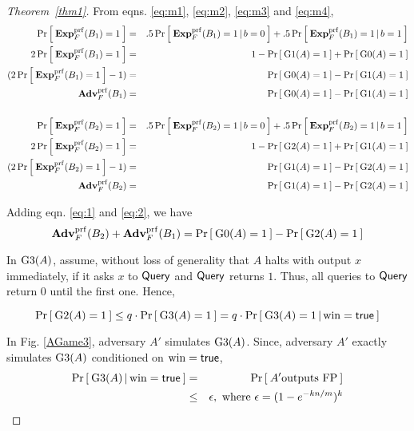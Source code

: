\begin{proof}[Theorem~\ref{thm1}]
From eqns. \ref{eq:m1}, \ref{eq:m2}, \ref{eq:m3} and \ref{eq:m4}, 
\begin{eqnarray}
\nonumber \Pr\left[\: \mathbf{Exp}^{\mathrm{prf}}_{F}(B_1) = 1 \:\right] &=& .5\Pr\left[\: \mathbf{Exp}^{\mathrm{prf}}_{F}(B_1)=1\,|\,b=0 \:\right] + .5\Pr\left[\: \mathbf{Exp}^{\mathrm{prf}}_{F}(B_1) = 1\,|\,b=1 \:\right]\\
\nonumber 2\Pr\left[\: \mathbf{Exp}^{\mathrm{prf}}_{F}(B_1) = 1 \:\right] &=& 1-\Pr\left[\: \text{G1}(A)=1 \:\right] + \Pr\left[\: \text{G0}(A)=1 \:\right]\\
\nonumber (2\Pr\left[\: \mathbf{Exp}^{\mathrm{prf}}_{F}(B_1) = 1 \:\right] - 1)  &=& \Pr\left[\: \text{G0}(A)=1 \:\right] - \Pr\left[\: \text{G1}(A)=1 \:\right]\\
 \mathbf{Adv}^{\mathrm{prf}}_{F}(B_1) &=& \Pr\left[\: \text{G0}(A)=1 \:\right] - \Pr\left[\: \text{G1}(A)=1 \:\right] \label{eq:1}\\
\nonumber& &\\
\nonumber \Pr\left[\: \mathbf{Exp}^{\mathrm{prf}}_{F}(B_2) = 1 \:\right] &=& .5\Pr\left[\: \mathbf{Exp}^{\mathrm{prf}}_{F}(B_2)=1\,|\,b=0 \:\right] + .5\Pr\left[\: \mathbf{Exp}^{\mathrm{prf}}_{F}(B_2) = 1\,|\,b=1 \:\right]\\
\nonumber 2\Pr\left[\: \mathbf{Exp}^{\mathrm{prf}}_{F}(B_2) = 1 \:\right] &=& 1-\Pr\left[\: \text{G2}(A)=1 \:\right] + \Pr\left[\: \text{G1}(A)=1 \:\right]\\
\nonumber (2\Pr\left[\: \mathbf{Exp}^{\mathrm{prf}}_{F}(B_2) = 1 \:\right] - 1)  &=& \Pr\left[\: \text{G1}(A)=1 \:\right] - \Pr\left[\: \text{G2}(A)=1 \:\right]\\
 \mathbf{Adv}^{\mathrm{prf}}_{F}(B_2) &=& \Pr\left[\: \text{G1}(A)=1 \:\right] - \Pr\left[\: \text{G2}(A)=1 \:\right] \label{eq:2}
\end{eqnarray}

\noindent
Adding eqn. \ref{eq:1} and \ref{eq:2}, we have
\begin{equation}
\mathbf{Adv}^{\mathrm{prf}}_{F}(B_2) +\mathbf{Adv}^{\mathrm{prf}}_{F}(B_1) = \Pr\left[\: \text{G0}(A)=1 \:\right] - \Pr\left[\: \text{G2}(A)=1 \:\right]\label{eq:2a}
\end{equation}

In $\text{G3}(A)$, assume, without loss of generality that $A$ halts with output $x$ immediately, if it asks $x$ to $\mathsf{Query}$ and $\mathsf{Query}$ returns $1$.  Thus, all queries to $\mathsf{Query}$ return 0 until the first one. Hence,

\begin{equation}
\Pr\left[\: \text{G2}(A)=1 \:\right] \leq q \cdot \Pr\left[\: \text{G3}(A)=1 \:\right] = q \cdot \Pr\left[\: \text{G3}(A)=1\,|\,\mathrm{win}=\mathsf{true} \:\right]\label{eq:3}
\end{equation}

In Fig. \ref{AGame3}, adversary $A'$ simulates $\text{G3}(A)$. Since, adversary $A'$ exactly simulates $\text{G3}(A)$ conditioned on $\mathrm{win} = \mathsf{true}$, 
\begin{eqnarray}
\nonumber \Pr\left[\: \text{G3}(A)\,|\,\mathrm{win}=\mathsf{true} \:\right] &=& \Pr\left[\: A' \mbox{outputs FP} \:\right]\\
& \leq & \epsilon,\mbox{ where } \epsilon = (1-e^{-kn/m})^k\label{eq:4}
\end{eqnarray}


\end{proof}
